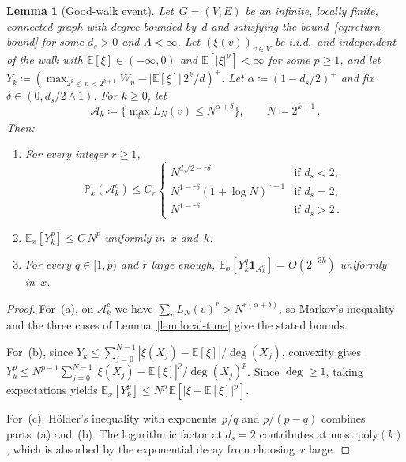 \documentclass[11pt]{amsart}
\theoremstyle{plain}
\newtheorem{lemma}[theorem]{Lemma}
\theoremstyle{definition}
\newcommand{\E}{\mathbb{E}}
\renewcommand{\P}{\mathbb{P}}
\newcommand{\one}{\mathbf{1}}
\begin{document}
	\begin{lemma}[Good-walk event]\label{lem:good-walk}
		Let~$G = (V,E)$ be an infinite, locally finite, connected graph with degree bounded by~$d$ and satisfying the bound~\eqref{eq:return-bound} for some $d_s>0$ and $A<\infty$. Let $(\xi(v))_{v\in V}$ be i.i.d.\ and independent of the walk with $\E[\xi]\in(-\infty,0)$ and $\E[|\xi|^p]<\infty$ for some $p\geq 1$, and let $Y_k\coloneqq(\max_{2^k\leq n<2^{k+1}}W_n-|\E[\xi]|\,2^k/d)^+$. Let $\alpha\coloneqq(1-d_s/2)^+$ and fix $\delta\in(0,d_s/2\wedge 1)$. For $k\geq 0$, let
		\begin{equation}
			\mathcal{A}_k\coloneqq\bigl\{\max_v L_N(v)\leq N^{\alpha+\delta}\bigr\},\qquad N\coloneqq 2^{k+1}\,.
		\end{equation}
		Then:
		\begin{enumerate}[label=\textup{(\alph*)}]
			\item For every integer $r\geq 1$,
			\[
			\P_x(\mathcal{A}_k^c)\leq C_r\begin{cases}
				N^{d_s/2-r\delta} & \text{if } d_s<2,\\[3pt]
				N^{1-r\delta}(1{+}\log N)^{r-1} & \text{if } d_s=2,\\[3pt]
				N^{1-r\delta} & \text{if } d_s>2\,.
			\end{cases}\,
			\]
			\item $\E_x[Y_k^p]\leq C\,N^p$ uniformly in~$x$ and~$k$.
			\item For every $q\in[1,p)$ and $r$ large enough, $\E_x[Y_k^q\one_{\mathcal{A}_k^c}]=O(2^{-3k})$ uniformly in~$x$.
		\end{enumerate}
	\end{lemma}
	\begin{proof}
		For~(a), on $\mathcal{A}_k^c$ we have $\sum_v L_N(v)^r>N^{r(\alpha+\delta)}$, so Markov's inequality and the three cases of Lemma~\ref{lem:local-time} give the stated bounds.
		
		For~(b), since $Y_k\leq\sum_{j=0}^{N-1}|\xi(X_j)-\E[\xi]|/\deg(X_j)$, convexity gives $Y_k^p\leq N^{p-1}\sum_{j=0}^{N-1}|\xi(X_j)-\E[\xi]|^p/\deg(X_j)^p$. Since $\deg\geq 1$, taking expectations yields $\E_x[Y_k^p]\leq N^p\,\E[|\xi-\E[\xi]|^p]$.
		
		For~(c), H\"older's inequality with exponents~$p/q$ and $p/(p{-}q)$ combines parts~(a) and~(b). The logarithmic factor at $d_s=2$ contributes at most $\mathrm{poly}(k)$, which is absorbed by the exponential decay from choosing~$r$ large.
	\end{proof}
	
\end{document}
